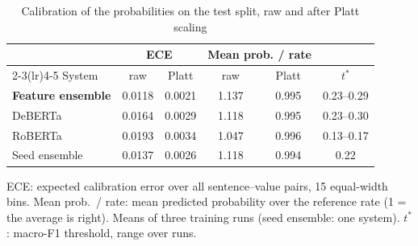 \begin{table}[t]
\caption{Calibration of the probabilities on the test split, raw and after Platt scaling}
\label{tab:calibration}
\centering
\footnotesize
\setlength{\tabcolsep}{4pt}
\begin{tabular*}{\columnwidth}{@{\extracolsep{\fill}}lccccc@{}}
\toprule
 & \multicolumn{2}{c}{ECE} & \multicolumn{2}{c}{Mean prob. / rate} & \\
\cmidrule(lr){2-3}\cmidrule(lr){4-5}
System & raw & Platt & raw & Platt & $t^*$ \\
\midrule
\textbf{Feature ensemble} & 0.0118 & 0.0021 & 1.137 & 0.995 & 0.23--0.29 \\
DeBERTa & 0.0164 & 0.0029 & 1.118 & 0.995 & 0.23--0.30 \\
RoBERTa & 0.0193 & 0.0034 & 1.047 & 0.996 & 0.13--0.17 \\
Seed ensemble & 0.0137 & 0.0026 & 1.118 & 0.994 & 0.22 \\
\bottomrule
\end{tabular*}
\par\vspace{2pt}
\begin{minipage}{\columnwidth}\scriptsize ECE: expected calibration error over all sentence--value pairs, 15 equal-width bins. Mean prob.\ / rate: mean predicted probability over the reference rate (1 = the average is right). Means of three training runs (seed ensemble: one system). $t^*$: macro-F1 threshold, range over runs.\end{minipage}
\end{table}
